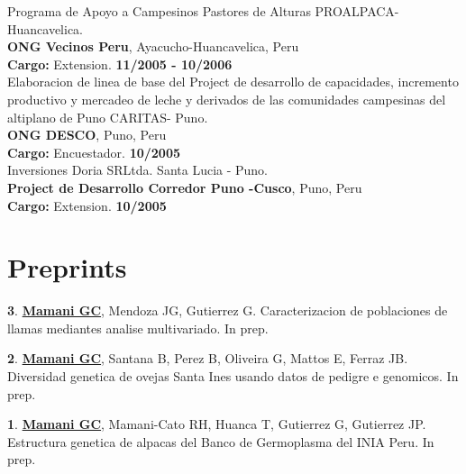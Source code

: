 \documentclass[margin,line,10pt]{res}
\newenvironment{list1}{
  \begin{list}{\ding{113}}{%
      \setlength{\itemsep}{0in}
      \setlength{\parsep}{0in} \setlength{\parskip}{0in}
      \setlength{\topsep}{0in} \setlength{\partopsep}{0in} 
      \setlength{\leftmargin}{0.17in}}}{\end{list}}
\begin{document}
\begin{resume}
Programa de Apoyo a Campesinos Pastores de Alturas PROALPACA-Huancavelica.\\
{\bf ONG Vecinos Peru}, Ayacucho-Huancavelica, Peru\\
\vspace{-.3cm}
\textbf{Cargo:} Extension.  \hfill {\bf 11/2005 - 10/2006}\\

Elaboracion de linea de base del Project de desarrollo de capacidades, incremento productivo y mercadeo de leche y derivados de las comunidades campesinas del altiplano de Puno CARITAS- Puno.\\
{\bf ONG DESCO}, Puno, Peru\\
\vspace{-.3cm}
\textbf{Cargo:} Encuestador.  \hfill {\bf 10/2005}\\

Inversiones Doria SRLtda. Santa Lucia - Puno.\\
{\bf Project de Desarrollo Corredor Puno -Cusco}, Puno, Peru\\
\vspace{-.3cm}
\textbf{Cargo:} Extension.  \hfill {\bf 10/2005}\\

\vspace{0.5cm}

\section{\sc Preprints}

\begin{list1}

\item [{\bf 3}.]  {\bf \underline{Mamani GC}}, Mendoza JG, Gutierrez G.   
     Caracterizacion de poblaciones de llamas mediantes analise multivariado. In prep. %
\vspace{0.5cm}
     
\item [{\bf 2}.]  {\bf \underline{Mamani GC}}, Santana B, Perez B, Oliveira G, Mattos E, Ferraz JB.   
     Diversidad genetica de ovejas Santa Ines usando datos de pedigre e genomicos. In prep. %
\vspace{0.5cm}

\item [{\bf 1}.]  {\bf \underline{Mamani GC}}, Mamani-Cato RH, Huanca T, Gutierrez G, Gutierrez JP.   
     Estructura genetica de alpacas del Banco de Germoplasma del INIA Peru. In prep. %


\end{list1}
\end{resume}
\end{document}
